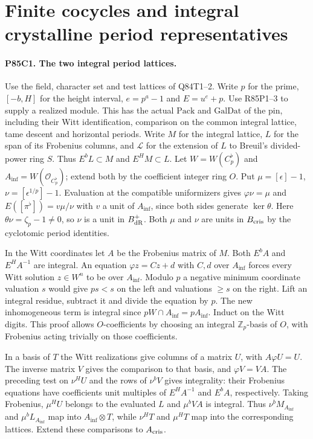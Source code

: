 \section{Finite cocycles and integral crystalline period representatives}

\paragraph{P85C1. The two integral period lattices.}
Use the field, character set and test lattices of Q84T1--2. Write $p$ for the
prime, $[-b,H]$ for the height interval, $e=p^a-1$ and $E=u^e+p$.
Use R85P1--3 to supply a realized module. This has the actual $\mathrm{Pack}$ and
$\mathrm{GalDat}$ of the pin, including their Witt identification,
comparison on the common integral lattice, tame descent and horizontal
periods. Write $M$ for the integral lattice, $L$ for the span of its
Frobenius columns, and $\mathcal L$ for the extension of $L$ to Breuil's
divided-power ring $S$. Thus $E^bL\subset M$ and $E^HM\subset L$.
Let $W=W(C_p^\flat)$ and $A_{\inf}=W(\mathcal O_{C_p^\flat})$;
extend both by the coefficient integer ring $O$. Put $\mu=[\epsilon]-1$,
$\nu=[\epsilon^{1/p}]-1$. Evaluation at the compatible uniformizers gives
$\varphi\nu=\mu$ and $E([\pi^\flat])=v\mu/\nu$ with $v$ a unit
of $A_{\inf}$, since both sides generate $\ker\theta$.
Here $\theta\nu=\zeta_p-1\ne0$, so $\nu$ is a unit in $B_{\rm dR}^+$.
Both $\mu$ and $\nu$ are units in $B_{\rm cris}$ by the cyclotomic
period identities.

In the Witt coordinates let $A$ be the Frobenius matrix of $M$.
Both $E^bA$ and $E^H A^{-1}$ are integral. An equation
$\varphi z=Cz+d$ with $C,d$ over $A_{\inf}$ forces every
Witt solution $z\in W^n$ to be over $A_{\inf}$. Modulo $p$ a
negative minimum coordinate valuation $s$ would give $ps<s$
on the left and valuations $\ge s$ on the right. Lift an integral
residue, subtract it and divide the equation by $p$. The new
inhomogeneous term is integral since $pW\cap A_{\inf}=pA_{\inf}$.
Induct on the Witt digits. This proof allows $O$-coefficients by
choosing an integral $\mathbb Z_p$-basis of $O$, with Frobenius
acting trivially on those coefficients.

In a basis of $T$ the Witt realizations give columns of a
matrix $U$, with $A\varphi U=U$. The inverse matrix $V$ gives
the comparison to that basis, and $\varphi V=VA$. The preceding
test on $\nu^H U$ and the rows of $\nu^b V$ gives integrality:
their Frobenius equations have coefficients unit multiples of
$E^H A^{-1}$ and $E^b A$, respectively. Taking Frobenius,
$\mu^HU$ belongs to the evaluated $L$ and $\mu^bVA$ is integral.
Thus $\nu^b M_{A_{\inf}}$ and $\mu^b L_{A_{\inf}}$ map into
$A_{\inf}\otimes T$, while $\nu^H T$ and $\mu^HT$ map into the
corresponding lattices. Extend these comparisons to $A_{\rm cris}$.

